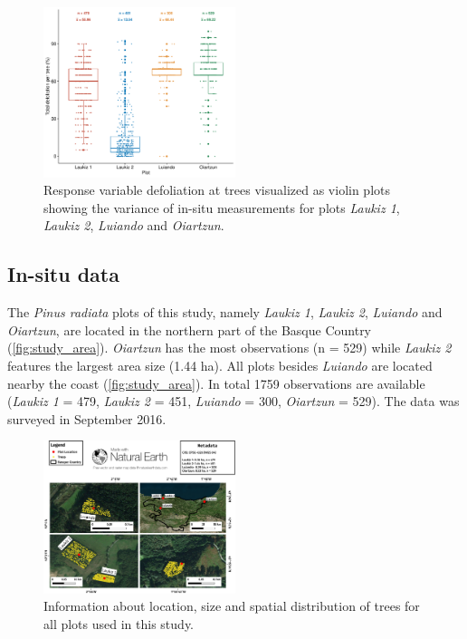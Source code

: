 \documentclass[letterpaper, journal]{IEEEtran}
\begin{document}
\begin{figure} [t!]
\centering
	\begin{center}
		\includegraphics[width=0.5\textwidth] {defoliation-distribution-plot-1.pdf}
        \caption{Response variable defoliation at trees visualized as violin plots showing the variance of in-situ measurements for plots \textit{Laukiz 1}, \textit{Laukiz 2}, \textit{Luiando} and \textit{Oiartzun}.}
		\label{fig:defol-distr}
	\end{center}
\end{figure}

\subsection{In-situ data}

\noindent The \textit{Pinus radiata} plots of this study, namely \textit{Laukiz 1}, \textit{Laukiz 2}, \textit{Luiando} and \textit{Oiartzun}, are located in the northern part of the Basque Country (\autoref{fig:study_area}).
\textit{Oiartzun} has the most observations (n = 529) while \textit{Laukiz 2} features the largest area size (1.44 ha).
All plots besides \textit{Luiando} are located nearby the coast (\autoref{fig:study_area}).
In total 1759 observations are available (\textit{Laukiz 1} = 479, \textit{Laukiz 2} = 451, \textit{Luiando} = 300, \textit{Oiartzun} = 529).
The data was surveyed in September 2016.

\begin{figure} [t!]
	\begin{center}
\centering
		\includegraphics[width=0.5\textwidth] {study-area-hyperspectral.pdf}
		\caption{Information about location, size and spatial distribution of trees for all plots used in this study.}
		\label{fig:study_area}
	\end{center}
\end{figure}
\end{document}
